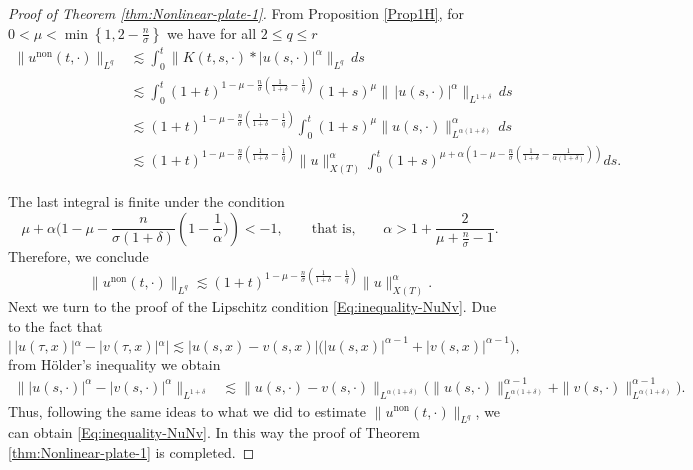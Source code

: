 \documentclass[10pt]{article}
\newcommand{\<}{\langle}
\renewcommand{\>}{\rangle}
\DeclareMathOperator{\nl}{non}
\numberwithin{equation}{section}
\begin{document}
\begin{proof}[Proof of Theorem \ref{thm:Nonlinear-plate-1}]
From Proposition \ref{Prop1H}, for  $0<\mu < \min\left\{1, 2-\frac{n}{\sigma}\right\}$ we have for all $2\leq q\leq r$
\begin{align*}
\|u^{\nl}(t,\cdot)\|_{L^q} &\lesssim \int_0^t \|K(t,s,\cdot)\ast |u(s,\cdot)|^\alpha\|_{L^q}\,ds \\
&\lesssim \int_0^{t} (1+t)^{1-\mu-\frac{n}{\sigma}\left(\frac{1}{1+\delta}-\frac{1}{q}\right)} (1+s)^\mu  \|\,|u(s,\cdot)|^\alpha\|_{L^{1+\delta}}\,ds \\
&\lesssim (1+t)^{1-\mu-\frac{n}{\sigma}\left(\frac{1}{1+\delta}-\frac{1}{q}\right)} \int_0^{t} (1+s)^\mu \|u(s,\cdot)\|_{L^{\alpha(1+\delta)}}^\alpha \,ds \\
& \lesssim (1+t)^{1-\mu-\frac{n}{\sigma}\left(\frac{1}{1+\delta}-\frac{1}{q}\right)} \|u\|_{X(T)}^\alpha \int_0^{t} (1+s)^{\mu+\alpha\left(1-\mu-\frac{n}{\sigma}\left(\frac{1}{1+\delta}-\frac{1}{\alpha(1+\delta)}\right)\right)} ds.
\end{align*}

The last integral is finite under the condition
\[ \mu+\alpha\Big(1-\mu-\frac{n}{\sigma(1+\delta)}\left(1-\frac{1}{\alpha}\Big) \right)<-1, \qquad \text{that is,} \qquad \alpha>1+\frac{2}{\mu+\frac{n}{\sigma}-1}. \]
%
Therefore, we conclude
\[ \|u^{\nl}(t,\cdot)\|_{L^q}
\lesssim (1+t)^{1-\mu-\frac{n}{\sigma}\left(\frac{1}{1+\delta}-\frac{1}{q}\right)} \|u\|_{X(T)}^\alpha. \]
Next we turn to the proof of the Lipschitz condition \eqref{Eq:inequality-NuNv}. Due to the fact that
\[ |\,|u(\tau,x)|^\alpha - |v(\tau,x)|^\alpha| \lesssim |u(s,x)-v(s,x)|\big( |u(s,x)|^{\alpha-1}+|v(s,x)|^{\alpha-1} \big), \]
from H\"{o}lder's inequality we obtain
\begin{align*}
\big\| |u(s,\cdot)|^\alpha-|v(s,\cdot)|^\alpha \big\|_{L^{1+\delta}} &\lesssim \| u(s,\cdot)-v(s,\cdot) \|_{L^{\alpha(1+\delta)}} \big( \|u(s,\cdot)\|_{L^{\alpha(1+\delta)}}^{\alpha-1}+\|v(s,\cdot)\|_{L^{\alpha(1+\delta)}}^{\alpha-1} \big).
\end{align*}
Thus, following the same ideas to what we did to estimate  $\|u^{\nl}(t,\cdot)\|_{L^q}$, we can obtain \eqref{Eq:inequality-NuNv}. In this way the proof of Theorem \ref{thm:Nonlinear-plate-1} is completed.
\end{proof}
\end{document}
